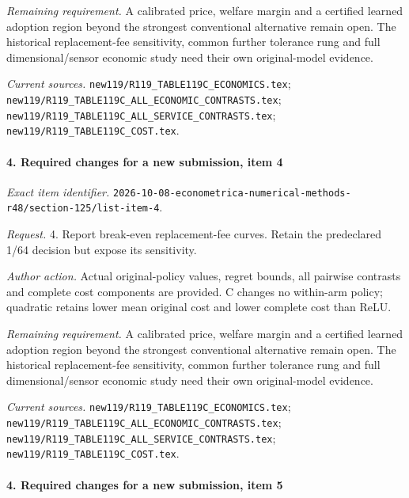 \par\emph{Remaining requirement.} A calibrated price, welfare margin and a certified learned adoption region beyond the strongest conventional alternative remain open. The historical replacement-fee sensitivity, common further tolerance rung and full dimensional/\allowbreak{}sensor economic study need their own original-model evidence.

\par\emph{Current sources.} \nolinkurl{new119/R119_TABLE119C_ECONOMICS.tex}; \nolinkurl{new119/R119_TABLE119C_ALL_ECONOMIC_CONTRASTS.tex}; \nolinkurl{new119/R119_TABLE119C_ALL_SERVICE_CONTRASTS.tex}; \nolinkurl{new119/R119_TABLE119C_COST.tex}.

\paragraph{4. Required changes for a new submission, item 4}

\emph{Exact item identifier.} \nolinkurl{2026-10-08-econometrica-numerical-methods-r48/section-125/list-item-4}.

\par\emph{Request.} 4. Report break-even replacement-fee curves. Retain the predeclared 1/64 decision but expose its sensitivity.

\par\emph{Author action.} Actual original-policy values, regret bounds, all pairwise contrasts and complete cost components are provided. C changes no within-arm policy; quadratic retains lower mean original cost and lower complete cost than ReLU.

\par\emph{Remaining requirement.} A calibrated price, welfare margin and a certified learned adoption region beyond the strongest conventional alternative remain open. The historical replacement-fee sensitivity, common further tolerance rung and full dimensional/\allowbreak{}sensor economic study need their own original-model evidence.

\par\emph{Current sources.} \nolinkurl{new119/R119_TABLE119C_ECONOMICS.tex}; \nolinkurl{new119/R119_TABLE119C_ALL_ECONOMIC_CONTRASTS.tex}; \nolinkurl{new119/R119_TABLE119C_ALL_SERVICE_CONTRASTS.tex}; \nolinkurl{new119/R119_TABLE119C_COST.tex}.

\paragraph{4. Required changes for a new submission, item 5}

